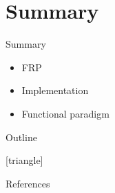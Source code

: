 \documentclass{beamer}
\begin{document}
\section{Summary}
\begin{frame}{Summary}
\begin{itemize}
    \item<1> FRP
    \item<2> Implementation
    \item<3> Functional paradigm
\end{itemize}
\end{frame}

\begin{frame}{Outline}
\tableofcontents
\end{frame}

[triangle]
\begin{frame}[allowframebreaks]{References}
    \raggedright
    \nocite{Berntsen2014-game-systems-haskell}
    \nocite{hudak2003arrows}
    \nocite{Elliott2009-push-pull-frp}
    \nocite{elm-making-pong}
    \nocite{haskell-wiki-netwire}
    
    
\end{frame}
\end{document}
